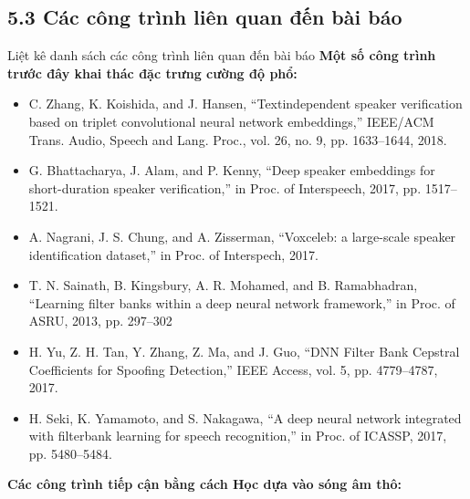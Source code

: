 \documentclass{article}
\begin{document}
	\subsection{5.3 Các công trình liên quan đến bài báo}
	Liệt kê danh sách các công trình liên quan đến bài báo\newline
	\textbf{Một số công trình trước đây khai thác đặc trưng cường độ phổ:}
	\begin{itemize}
		\item C. Zhang, K. Koishida, and J. Hansen, “Textindependent speaker verification based on triplet convolutional neural network embeddings,” IEEE/ACM Trans. Audio, Speech and Lang. Proc., vol. 26, no. 9,
		pp. 1633–1644, 2018.
		
		\item G. Bhattacharya, J. Alam, and P. Kenny, “Deep speaker
		embeddings for short-duration speaker verification,” in
		Proc. of Interspeech, 2017, pp. 1517–1521.
		
		\item A. Nagrani, J. S. Chung, and A. Zisserman, “Voxceleb:
		a large-scale speaker identification dataset,” in Proc. of
		Interspech, 2017.
		
		\item T. N. Sainath, B. Kingsbury, A. R. Mohamed, and
		B. Ramabhadran, “Learning filter banks within a deep
		neural network framework,” in Proc. of ASRU, 2013,
		pp. 297–302
		
		\item H. Yu, Z. H. Tan, Y. Zhang, Z. Ma, and J. Guo, “DNN
		Filter Bank Cepstral Coefficients for Spoofing Detection,” IEEE Access, vol. 5, pp. 4779–4787, 2017.
		
		\item H. Seki, K. Yamamoto, and S. Nakagawa, “A deep
		neural network integrated with filterbank learning for
		speech recognition,” in Proc. of ICASSP, 2017, pp.
		5480–5484.
	\end{itemize}
	\textbf{Các công trình tiếp cận bằng cách Học dựa vào sóng âm thô:}
\end{document}

